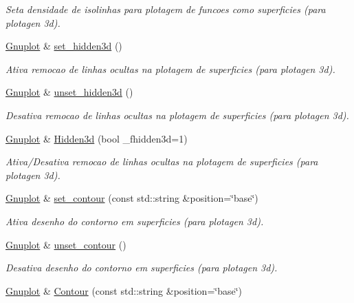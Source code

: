 \begin{DoxyCompactItemize}
\begin{DoxyCompactList}\small\item\em Seta densidade de isolinhas para plotagem de funcoes como superficies (para plotagen 3d). \end{DoxyCompactList}\item 
\hyperlink{class_gnuplot}{Gnuplot} \& \hyperlink{class_gnuplot_a5ada5c76db0a735d3d331caa0eb4968a}{set\+\_\+hidden3d} ()
\begin{DoxyCompactList}\small\item\em Ativa remocao de linhas ocultas na plotagem de superficies (para plotagen 3d). \end{DoxyCompactList}\item 
\hyperlink{class_gnuplot}{Gnuplot} \& \hyperlink{class_gnuplot_a763ff17df1679cc2b1463b024aa89ebc}{unset\+\_\+hidden3d} ()
\begin{DoxyCompactList}\small\item\em Desativa remocao de linhas ocultas na plotagem de superficies (para plotagen 3d). \end{DoxyCompactList}\item 
\hyperlink{class_gnuplot}{Gnuplot} \& \hyperlink{class_gnuplot_a9004d7b6d322be1eeb32eb8eb0c25487}{Hidden3d} (bool \+\_\+fhidden3d=1)
\begin{DoxyCompactList}\small\item\em Ativa/\+Desativa remocao de linhas ocultas na plotagem de superficies (para plotagen 3d). \end{DoxyCompactList}\item 
\hyperlink{class_gnuplot}{Gnuplot} \& \hyperlink{class_gnuplot_af845efc728a90d7e10de764eff0b2423}{set\+\_\+contour} (const std\+::string \&position=\char`\"{}base\char`\"{})
\begin{DoxyCompactList}\small\item\em Ativa desenho do contorno em superficies (para plotagen 3d). \end{DoxyCompactList}\item 
\hyperlink{class_gnuplot}{Gnuplot} \& \hyperlink{class_gnuplot_a39d10e6ce85875939a9c594d132a10d7}{unset\+\_\+contour} ()
\begin{DoxyCompactList}\small\item\em Desativa desenho do contorno em superficies (para plotagen 3d). \end{DoxyCompactList}\item 
\hyperlink{class_gnuplot}{Gnuplot} \& \hyperlink{class_gnuplot_a826a0f860cd984748f8c7ee80228fce7}{Contour} (const std\+::string \&position=\char`\"{}base\char`\"{})

\end{DoxyCompactItemize}

